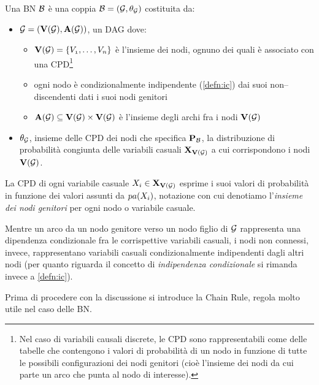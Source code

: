\begin{definizione}[\acl{BN}]
\label{defn:bn}
Una \acl{BN} $\mathcal{B}$ è una coppia $\mathcal{B}=(\mathcal{G},\theta_{\mathcal{G}})$ costituita da:
\begin{itemize}
    \item $\mathcal{G}=(\mathbf{V}(\mathcal{G}),\mathbf{A}(\mathcal{G}))$, un \acl{DAG} dove:
    \begin{itemize}
        \item $\mathbf{V}(\mathcal{G})=\{\mathnormal{V_1}, \dotsc, \mathnormal{V_n}\}$ è l'insieme dei nodi, ognuno dei quali è associato con una \acf{CPD}\footnote{Nel caso di variabili causali discrete, le \acs{CPD} sono rappresentabili come delle tabelle che contengono i valori di probabilità di un nodo in funzione di tutte le possibili configurazioni dei nodi genitori (cioè l'insieme dei nodi da cui parte un arco che punta al nodo di interesse).}
        \label{defn:bn-markov-assumption}
        \item ogni nodo è condizionalmente indipendente (\ref{defn:ic}) dai suoi non--discendenti dati i suoi nodi genitori
        \item $\mathbf{A}(\mathcal{G})\subseteq\mathbf{V}(\mathcal{G})\times\mathbf{V}(\mathcal{G})$ è l'insieme degli archi fra i nodi $\mathbf{V}(\mathcal{G})$
    \end{itemize}
    \item $\theta_{\mathcal{G}}$, insieme delle \acs{CPD} dei nodi che specifica $\mathbf{P}_{\mathcal{B}}$, la distribuzione di probabilità congiunta delle variabili casuali $\mathbf{X}_{\mathbf{V}(\mathcal{G})}$ a cui corrispondono i nodi $\mathbf{V}(\mathcal{G})$.
\end{itemize}
\end{definizione}

La \acs{CPD} di ogni variabile casuale $\mathnormal{X_i}\in\mathbf{X}_{\mathbf{V}(\mathcal{G})}$ esprime i suoi valori di probabilità in funzione dei valori assunti da $pa(\mathnormal{X_i})$, notazione con cui denotiamo l'\emph{insieme dei nodi genitori} per ogni nodo o variabile casuale.

Mentre un arco da un nodo genitore verso un nodo figlio di $\mathcal{G}$ rappresenta una dipendenza condizionale fra le corrispettive variabili casuali, i nodi non connessi, invece, rappresentano variabili casuali condizionalmente indipendenti dagli altri nodi (per quanto riguarda il concetto di \emph{indipendenza condizionale} si rimanda invece a \ref{defn:ic}).

Prima di procedere con la discussione si introduce la Chain Rule, regola molto utile nel caso delle \acs{BN}.

